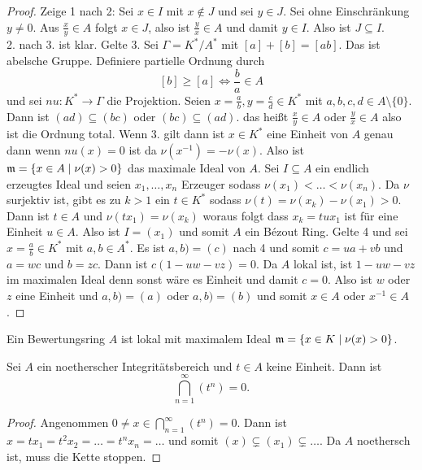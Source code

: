 \begin{proof}
	Zeige 1 nach 2: Sei \(x\in I\) mit \(x\not\in J\) und sei \(y\in J\). Sei ohne Einschränkung \(y\neq 0\).
	Aus \(\frac x y\in A\) folgt \(x\in J\), also ist \(\frac y x\in A\) und damit \(y\in I\).
	Also ist \(J\subseteq I\).\\
	2. nach 3. ist klar.
	Gelte 3. Sei \(\Gamma=K^*/A^*\) mit \([a]+[b]=[ab]\). Das ist abelsche Gruppe. Definiere partielle Ordnung durch
	\[[b]\geq [a] \iff \frac b a \in A\] und sei \(nu\colon K^*\to \Gamma\) die Projektion. 
	Seien \(x=\frac{a}{b},y=\frac{c}{d}\in K^*\) mit \(a,b,c,d\in A\setminus\{0\}\). Dann ist \((ad)\subseteq (bc)\) oder \((bc)\subseteq (ad)\).
	das heißt \(\frac x y \in A\) oder \(\frac y x\in A\) also ist die Ordnung total.
	Wenn 3. gilt dann ist \(x\in K^*\) eine Einheit von \(A\) genau dann wenn \(nu(x)=0\) ist da \(\nu(x^{-1})=-\nu(x)\).
	Also ist \(\mathfrak{m}=\{x\in A\mid \nu(x)>0\}\) das maximale Ideal von \(A\).
	Sei \(I\subseteq A\) ein endlich erzeugtes Ideal und seien \(x_1,\dots,x_n\) Erzeuger sodass \(\nu(x_1)<\dots<\nu(x_n)\). Da \(\nu\) 
	surjektiv ist, gibt es zu \(k>1\) ein \(t\in K^*\) sodass \(\nu(t)=\nu(x_k)-\nu(x_1)>0\). Dann ist \(t\in A\) und \(\nu(tx_1)=\nu(x_k)\) woraus folgt
	dass \(x_k=tux_1\) ist für eine Einheit \(u\in A\). Also ist \(I=(x_1)\) und somit \(A\) ein Bézout Ring.
	Gelte 4 und sei \(x=\frac a b \in K^*\) mit \(a,b\in A^*\). Es ist \(a,b)=(c)\) nach 4 und somit \(c=ua+vb\) und \(a=wc\) und \(b=zc\).
	Dann ist \(c(1-uw-vz)=0\). Da \(A\) lokal ist, ist \(1-uw-vz\) im maximalen Ideal denn sonst wäre es Einheit und damit \(c=0\).
	Also ist \(w\) oder \(z\) eine Einheit und \(a,b)=(a)\) oder \(a,b)=(b)\) und somit \(x\in A\) oder \(x^{-1}\in A\).
\end{proof}
\begin{Bem} Ein Bewertungsring \(A\) ist lokal mit maximalem Ideal \(\mathfrak{m}=\{x\in K\mid \nu(x)> 0\}\).
	
\end{Bem}
\begin{Lemma}\label{Lem:NoethIntIntersect}
	Sei \(A\) ein noetherscher Integritätsbereich und \(t\in A\) keine Einheit. Dann ist \[\bigcap_{n=1}^\infty (t^n)=0.\]
	
\end{Lemma}
\begin{proof}
	Angenommen \(0\neq x\in \bigcap _{n=1}^\infty (t^n)=0\).
	Dann ist \(x=tx_1=t^2x_2=\dots=t^nx_n=\dots\) und somit \((x)\subsetneq (x_1)\subsetneq \dots\). Da \(A\) noethersch ist,
	muss die Kette stoppen.
\end{proof}
